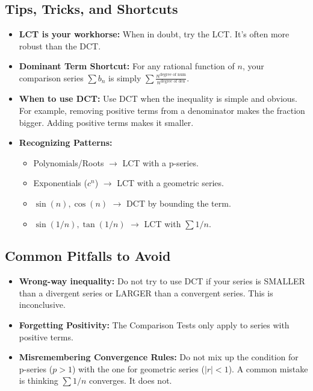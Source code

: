 \documentclass{article}
\begin{document}
\subsection{Tips, Tricks, and Shortcuts}
\begin{itemize}
    \item \textbf{LCT is your workhorse:} When in doubt, try the LCT. It's often more robust than the DCT.
    \item \textbf{Dominant Term Shortcut:} For any rational function of \(n\), your comparison series \(\sum b_n\) is simply \(\sum \frac{n^{\text{degree of num}}}{n^{\text{degree of den}}}\).
    \item \textbf{When to use DCT:} Use DCT when the inequality is simple and obvious. For example, removing positive terms from a denominator makes the fraction bigger. Adding positive terms makes it smaller.
    \item \textbf{Recognizing Patterns:}
        \begin{itemize}
            \item Polynomials/Roots \(\to\) LCT with a p-series.
            \item Exponentials (\(c^n\)) \(\to\) LCT with a geometric series.
            \item \(\sin(n), \cos(n)\) \(\to\) DCT by bounding the term.
            \item \(\sin(1/n), \tan(1/n)\) \(\to\) LCT with \(\sum 1/n\).
        \end{itemize}
\end{itemize}

\subsection{Common Pitfalls to Avoid}
\begin{itemize}
    \item \textbf{Wrong-way inequality:} Do not try to use DCT if your series is SMALLER than a divergent series or LARGER than a convergent series. This is inconclusive.
    \item \textbf{Forgetting Positivity:} The Comparison Tests only apply to series with positive terms.
    \item \textbf{Misremembering Convergence Rules:} Do not mix up the condition for p-series (\(p>1\)) with the one for geometric series (\(|r|<1\)). A common mistake is thinking \(\sum 1/n\) converges. It does not.
\end{itemize}
\end{document}
